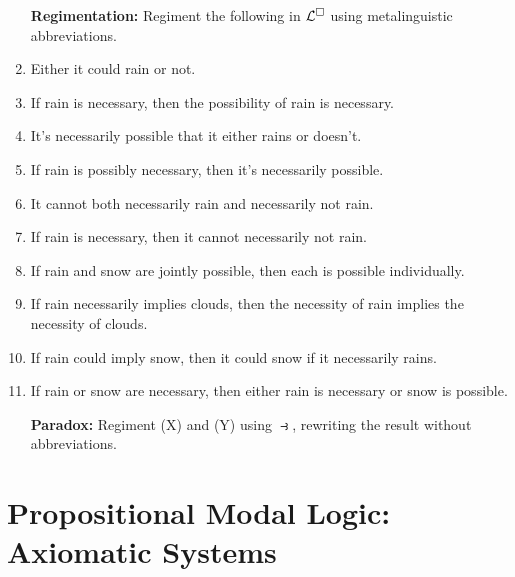 \documentclass[a4paper, 11pt]{article} %
\begin{document}
\begin{enumerate}[leftmargin=1.2in,itemsep=2pt]\small
	\item[\bf Regimentation:] Regiment the following in $\mathcal{L}^{\square}$ using metalinguistic abbreviations.
	\item Either it could rain or not.
	\item If rain is necessary, then the possibility of rain is necessary.
	\item It's necessarily possible that it either rains or doesn't.
	\item If rain is possibly necessary, then it's necessarily possible.
	\item It cannot both necessarily rain and necessarily not rain.
	\item If rain is necessary, then it cannot necessarily not rain.
	\item If rain and snow are jointly possible, then each is possible individually.
	\item If rain necessarily implies clouds, then the necessity of rain implies the necessity of clouds.
	\item If rain could imply snow, then it could snow if it necessarily rains.
	\item If rain or snow are necessary, then either rain is necessary or snow is possible.
  \item[\bf Paradox:] Regiment (X) and (Y) using $\strictif$, rewriting the result without abbreviations. 
\end{enumerate}



\section*{\sc Propositional Modal Logic: Axiomatic Systems}
\end{document}
